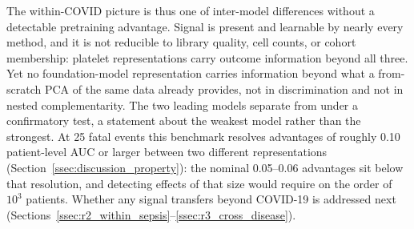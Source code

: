 The within-COVID picture is thus one of inter-model differences without a
detectable pretraining advantage. Signal is present and learnable by nearly
every method, and it is not reducible to library quality, cell counts, or
cohort membership: platelet representations carry outcome information beyond
all three. Yet no foundation-model representation carries information beyond
what a from-scratch PCA of the same data already provides, not in
discrimination and not in nested complementarity. The two leading models
separate from  under a confirmatory test, a statement about the
weakest model rather than the strongest. At 25 fatal events this benchmark
resolves advantages of roughly 0.10 patient-level AUC or larger between two
different representations (Section~\ref{ssec:discussion_property}): the
nominal 0.05--0.06 advantages sit below that resolution, and detecting effects
of that size would require on the order of $10^3$ patients. Whether any signal
transfers beyond COVID-19 is addressed next
(Sections~\ref{ssec:r2_within_sepsis}--\ref{ssec:r3_cross_disease}).
